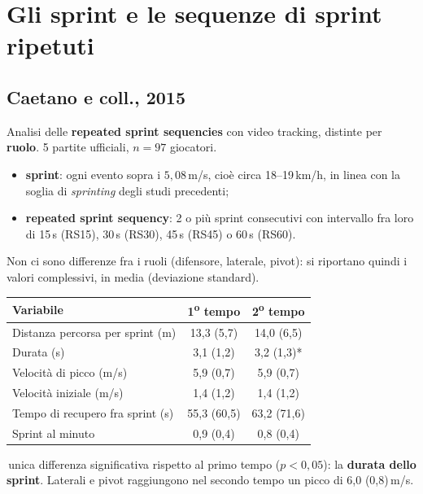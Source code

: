 \section{Gli sprint e le sequenze di sprint ripetuti}

\subsection{Caetano e coll., 2015}

Analisi delle \textbf{repeated sprint sequencies} con video tracking, distinte per \textbf{ruolo}. 5
partite ufficiali, $n = 97$ giocatori.
\begin{itemize}
  \item \textbf{sprint}: ogni evento sopra i $5{,}08$\,m/s, cioè circa 18--19\,km/h, in linea con la
    soglia di \textit{sprinting} degli studi precedenti;
  \item \textbf{repeated sprint sequency}: 2 o più sprint consecutivi con intervallo fra loro di
    15\,s (RS15), 30\,s (RS30), 45\,s (RS45) o 60\,s (RS60).
\end{itemize}

Non ci sono differenze fra i ruoli (difensore, laterale, pivot): si riportano quindi i valori
complessivi, in media (deviazione standard).

\begin{center}
\footnotesize
\begin{tabular}{|l|c|c|}
\hline
\textbf{Variabile} & \textbf{1\textsuperscript{o} tempo} & \textbf{2\textsuperscript{o} tempo} \\
\hline
Distanza percorsa per sprint (m)      & 13,3 (5,7)  & 14,0 (6,5) \\
Durata (s)                            & 3,1 (1,2)   & 3,2 (1,3)* \\
Velocità di picco (m/s)               & 5,9 (0,7)   & 5,9 (0,7) \\
Velocità iniziale (m/s)               & 1,4 (1,2)   & 1,4 (1,2) \\
Tempo di recupero fra sprint (s)      & 55,3 (60,5) & 63,2 (71,6) \\
Sprint al minuto                      & 0,9 (0,4)   & 0,8 (0,4) \\
\hline
\end{tabular}
\end{center}
\footnotesize *\,unica differenza significativa rispetto al primo tempo ($p < 0{,}05$): la
\textbf{durata dello sprint}. Laterali e pivot raggiungono nel secondo tempo un picco di 6,0
(0,8)\,m/s.
\normalsize

